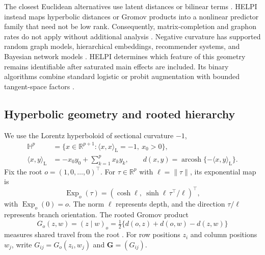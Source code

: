 \documentclass[
  12pt]{article}
\theoremstyle{definition}
\theoremstyle{plain}
\newcommand{\R}{\mathbb R}
\newcommand{\Hh}{\mathbb H}
\newcommand{\bG}{\mathbf G}
\DeclareMathOperator{\arcosh}{arcosh}
\DeclareMathOperator{\Exp}{Exp}
\begin{document}
The closest Euclidean alternatives use latent distances or bilinear terms \citep{hoff_2002_LatentSpaceApproaches,hoff_2005_BilinearMixedEffectsModels}. HELPI instead maps hyperbolic distances or Gromov products into a nonlinear predictor family that need not be low rank. Consequently, matrix-completion and graphon rates do not apply without additional analysis \citep{davenport_2014_1BitMatrixCompletion,gao_2015_RateoptimalGraphonEstimation}. Negative curvature has supported random graph models, hierarchical embeddings, recommender systems, and Bayesian network models \citep{krioukov_2010_HyperbolicGeometryComplex,kitsak_2017_LatentGeometryBipartite,nickel_2017_PoincareEmbeddingsLearning,ganea_2018_HyperbolicNeuralNetworks,chamberlain_2019_ScalableHyperbolicRecommender,smith_2019_GeometryContinuousLatent,vinhtran_2020_HyperMLBoostingMetric,papamichalis_2022_LatentSpaceNetwork}. HELPI determines which feature of this geometry remains identifiable after saturated main effects are included. Its binary algorithms combine standard logistic or probit augmentation with bounded tangent-space factors \citep{albert_1993_BayesianAnalysisBinary,jaakkola_2000_BayesianParameterEstimation,polson_2013_BayesianInferenceLogistic,durante_2019_ConditionallyConjugateMeanField,mathieu_2019_ContinuousHierarchicalRepresentations,nagano_2019_WrappedNormalDistribution}.


\subsection{Hyperbolic geometry and rooted hierarchy}
\label{sec:geometry}

We use the Lorentz hyperboloid of sectional curvature $-1$,
\[
\begin{aligned}
\Hh^p&=\{x\in\R^{p+1}:\langle x,x\rangle_{\mathrm L}=-1,\ x_0>0\},\\
\langle x,y\rangle_{\mathrm L}&=-x_0y_0+\sum_{k=1}^p x_ky_k,
\qquad d(x,y)=\arcosh\{-\langle x,y\rangle_{\mathrm L}\}.
\end{aligned}
\]
Fix the root $o=(1,0,\ldots,0)^\top$. For $\tau\in\R^p$ with $\ell=\|\tau\|$, its exponential map is
\[
\Exp_o(\tau)=(\cosh\ell,\ \sinh\ell\,\tau^\top/\ell)^\top,
\]
with $\Exp_o(0)=o$. The norm $\ell$ represents depth, and the direction $\tau/\ell$ represents branch orientation. The rooted Gromov product
\[
G_o(z,w)=(z\mid w)_o=\tfrac12\{d(o,z)+d(o,w)-d(z,w)\}
\]
measures shared travel from the root \citep{bridson_1999_MetricSpacesNonpositive}. For row positions $z_i$ and column positions $w_j$, write $G_{ij}=G_o(z_i,w_j)$ and $\bG=(G_{ij})$.
\end{document}
